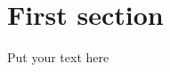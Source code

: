 \documentclass{pharmrep}
\begin{document}

\section{First section}
Put your text here

\printnoidxglossary[title={List of Abbreviations}]%
\printbibliography%
\end{document}
